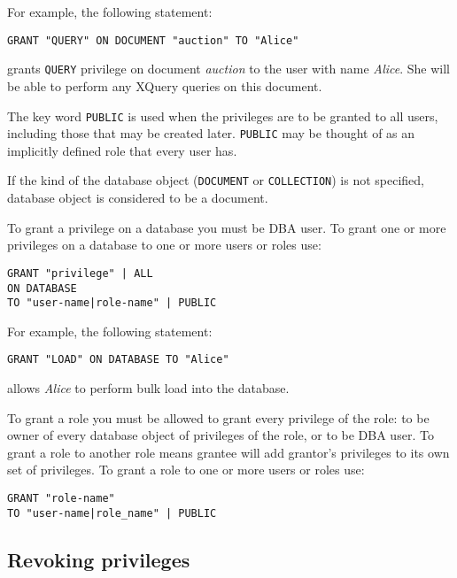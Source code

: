 \documentclass[a4paper,12pt]{article}
\begin{document}
For example, the following statement:

\begin{verbatim}
GRANT "QUERY" ON DOCUMENT "auction" TO "Alice"
\end{verbatim}

grants \verb!QUERY! privilege on document \emph{auction} to the user with name
\emph{Alice}. She will be able to perform any XQuery queries on this document. 

The key word \verb!PUBLIC! is used when the privileges are to be granted to all
users, including those that may be created later. \verb!PUBLIC! may be thought
of as an implicitly defined role that every user has.

If the kind of the database object (\verb!DOCUMENT! or \verb!COLLECTION!) is not
specified, database object is considered to be a document.

To grant a privilege on a database you must be DBA user. To grant one or more
privileges on a database to one or more users or roles use:

\begin{verbatim}
GRANT "privilege" | ALL
ON DATABASE
TO "user-name|role-name" | PUBLIC
\end{verbatim}

For example, the following statement:

\begin{verbatim}
GRANT "LOAD" ON DATABASE TO "Alice"
\end{verbatim}

allows \emph{Alice} to perform bulk load into the database. 

To grant a role you must be allowed to grant every privilege of the role: to be
owner of every database object of privileges of the role, or to be DBA user. To
grant a role to another role means grantee will add grantor's privileges to its
own set of privileges. To grant a role to one or more users or roles use:

\begin{verbatim}
GRANT "role-name"
TO "user-name|role_name" | PUBLIC
\end{verbatim}


\subsection{Revoking privileges}
\end{document}
